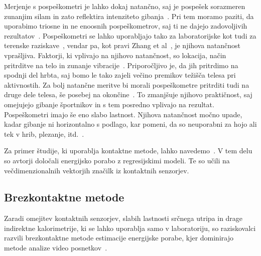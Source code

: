 Merjenje s pospeškometri je lahko dokaj natančno, saj je pospešek sorazmeren zunanjim silam in zato reflektira intenziteto gibanja~\cite{yang2010review}. Pri tem moramo paziti, da uporabimo triosne in ne enoosnih pospeškometrov, saj ti ne dajejo zadovoljivih rezultatov~\cite{levine2005measurement}. Pospeškometri se lahko uporabljajo tako za laboratorijske kot tudi za terenske raziskave~\cite{yang2014sleep}, vendar pa, kot pravi Zhang et al~\cite{zhang2004improving}, je njihova natančnost vprašljiva. Faktorji, ki vplivajo na njihovo natančnost, so lokacija, način pritrditve na telo in zunanje vibracije~\cite{yang2010review}. Priporočljivo je, da jih pritrdimo na spodnji del hrbta, saj bomo le tako zajeli večino premikov težišča telesa pri aktivnostih. Za bolj natančne meritve bi morali pospeškometre pritrditi tudi na druge dele telesa, še posebej na okončine~\cite{yang2010review}. To zmanjšuje njihovo praktičnost, saj omejujejo gibanje športnikov in s tem posredno vplivajo na rezultat. Pospeškometri imajo še eno slabo lastnost. Njihova natančnost močno upade, kadar gibanje ni horizontalno s podlago, kar pomeni, da so neuporabni za hojo ali tek v hrib, plezanje, itd.~\cite{yang2010review}.

Za primer študije, ki uporablja kontaktne metode, lahko navedemo~\cite{gjoreski2015context}. V tem delu so avtorji določali energijsko porabo z regresijskimi modeli. Te so učili na večdimenzionalnih vektorjih značilk iz kontaktnih senzorjev.





\subsection{Brezkontaktne metode}

Zaradi omejitev kontaktnih senzorjev, slabih lastnosti srčnega utripa in drage indirektne kalorimetrije, ki se lahko uporablja samo v laboratoriju, so raziskovalci razvili brezkontaktne metode estimacije energijske porabe, kjer dominirajo metode analize video posnetkov~\cite{botton2011energy,osgnach2010energy,silva2015assessing,peker2004framework,nathan2015estimating}. 

